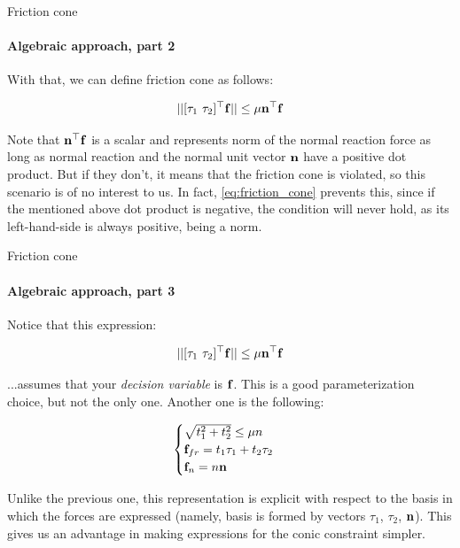 \documentclass{beamer}
\begin{document}
\begin{frame}{Friction cone}
\framesubtitle{Algebraic approach, part 2}
\begin{flushleft}

With that, we can define friction cone as follows:

\begin{equation}
\label{eq:friction_cone}
    || [\tau_1 \ \tau_2]^\top \mathbf{f} || \leq \mu \mathbf{n}^\top \mathbf{f}
\end{equation}

Note that $\mathbf{n}^\top \mathbf{f}$ is a scalar and represents norm of the normal reaction force as long as normal reaction and the normal unit vector $\mathbf{n}$ have a positive dot product. But if they don't, it means that the friction cone is violated, so this scenario is of no interest to us. In fact, \eqref{eq:friction_cone} prevents this, since if the mentioned above dot product is negative, the condition will never hold, as its left-hand-side is always positive, being a norm.

\end{flushleft}
\end{frame}





\begin{frame}{Friction cone}
\framesubtitle{Algebraic approach, part 3}
\begin{flushleft}

Notice that this expression:

\begin{equation}
\label{eq:friction_cone_2}
    || [\tau_1 \ \tau_2]^\top \mathbf{f} || \leq \mu \mathbf{n}^\top \mathbf{f}
\end{equation}

...assumes that your \emph{decision variable} is $\mathbf{f}$. This is a good parameterization choice, but not the only one. Another one is the following:

\begin{equation}
\label{eq:friction_cone_3}
\begin{cases}
    \sqrt{t_1^2 + t_2^2} \leq \mu n \\
    \mathbf{f}_{fr} = t_1 \tau_1 + t_2 \tau_2 \\
    \mathbf{f}_n = n \mathbf{n}  
\end{cases}
\end{equation}

Unlike the previous one, this representation is explicit with respect to the basis in which the forces are expressed (namely, basis is formed by vectors $\tau_1$, $\tau_2$, $\mathbf{n} $). This gives us an advantage in making expressions for the conic constraint simpler.

\end{flushleft}
\end{frame}
\end{document}

